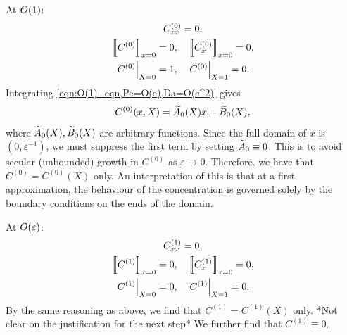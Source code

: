 At \(O(1)\):
\begin{subequations}
    \label{eqn:O(1),Pe=O(e),Da=O(e^2)}
    \begin{gather}
        \label{eqn:O(1)_eqn,Pe=O(e),Da=O(e^2)}
        C^{(0)}_{xx} = 0,\\
        \label{eqn:O(1)_jump_cond,Pe=O(e),Da=O(e^2)}
        \left\llbracket C^{(0)} \right\rrbracket_{x=0}=0, \quad \left\llbracket C^{(0)}_x \right\rrbracket_{x=0}=0,\\
        \label{eqn:O(1)_bcs,Pe=O(e),Da=O(e^2)}
        \left.C^{(0)}\right|_{X=0}=1, \quad \left.C^{(0)}\right|_{X=1}=0.
    \end{gather}
\end{subequations}
Integrating \eqref{eqn:O(1)_eqn,Pe=O(e),Da=O(e^2)} gives
\begin{equation}
    \label{}
    C^{(0)}(x,X) = \widetilde{A}_0(X)x + \widetilde{B}_0(X),
\end{equation}
where \(\widetilde{A}_0(X),\widetilde{B}_0(X)\) are arbitrary functions. Since the full
domain of \(x\) is \((0,\varepsilon^{-1})\), we must suppress the first term by
setting \(\widetilde{A}_0 \equiv 0\). This is to avoid secular (unbounded) growth in
\(C^{(0)}\) as \(\varepsilon \to 0\). Therefore, we have that \(C^{(0) } =
C^{(0)}(X)\) only. An interpretation of this is that at a first approximation,
the behaviour of the concentration is governed solely by the boundary
conditions on the ends of the domain.

At \(O(\varepsilon)\):
\begin{subequations}
    \label{eqn:O(e),Pe=O(e),Da=O(e^2)}
    \begin{gather}
        \label{eqn:O(e)_eqn,Pe=O(e),Da=O(e^2)}
        C^{(1)}_{xx} = 0,\\
        \label{eqn:O(e)_jump_cond,Pe=O(e),Da=O(e^2)}
        \left\llbracket C^{(1)} \right\rrbracket_{x=0}=0, \quad \left\llbracket C^{(1)}_x \right\rrbracket_{x=0}=0,\\
        \label{eqn:O(e)_bcs,Pe=O(e),Da=O(e^2)}
        \left.C^{(1)}\right|_{X=0}=0, \quad \left.C^{(1)}\right|_{X=1}=0.
    \end{gather}
\end{subequations}
By the same reasoning as above, we find that \(C^{(1)} = C^{(1)}(X)\) only.
*Not clear on the justification for the next step* We further find that
\(C^{(1)} \equiv 0\).

